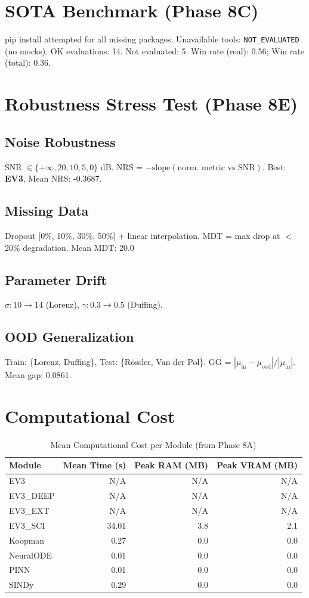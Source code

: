 \documentclass[12pt,a4paper]{article}
\begin{document}
\section{SOTA Benchmark (Phase 8C)}
pip install attempted for all missing packages.
Unavailable tools: \texttt{NOT\_EVALUATED} (no mocks).
OK evaluations: 14. Not evaluated: 5.
Win rate (real): 0.56; Win rate (total): 0.36.

\section{Robustness Stress Test (Phase 8E)}
\subsection{Noise Robustness}
SNR $\in \{+\infty, 20, 10, 5, 0\}$ dB. NRS = $-\text{slope}(\text{norm. metric vs SNR})$.
Best: \textbf{EV3}, Mean NRS: -0.3687.

\subsection{Missing Data}
Dropout [0\%, 10\%, 30\%, 50\%] + linear interpolation. MDT = max drop at $<$20\% degradation.
Mean MDT: 20.0%

\subsection{Parameter Drift}
$\sigma: 10 \to 14$ (Lorenz), $\gamma: 0.3 \to 0.5$ (Duffing).

\subsection{OOD Generalization}
Train: \{Lorenz, Duffing\}, Test: \{R\"ossler, Van der Pol\}.
GG = $|\mu_{\text{in}} - \mu_{\text{ood}}|/|\mu_{\text{in}}|$. Mean gap: 0.0861.

\section{Computational Cost}
\begin{table}[h]
\centering
\caption{Mean Computational Cost per Module (from Phase 8A)}
\begin{tabular}{lrrr}
\toprule
Module & Mean Time (s) & Peak RAM (MB) & Peak VRAM (MB) \\
\midrule
        EV3 & N/A & N/A & N/A \\
        EV3\_DEEP & N/A & N/A & N/A \\
        EV3\_EXT & N/A & N/A & N/A \\
        EV3\_SCI & 34.01 & 3.8 & 2.1 \\
        Koopman & 0.27 & 0.0 & 0.0 \\
        NeuralODE & 0.01 & 0.0 & 0.0 \\
        PINN & 0.01 & 0.0 & 0.0 \\
        SINDy & 0.29 & 0.0 & 0.0 \\
\bottomrule
\end{tabular}
\end{table}
\end{document}
